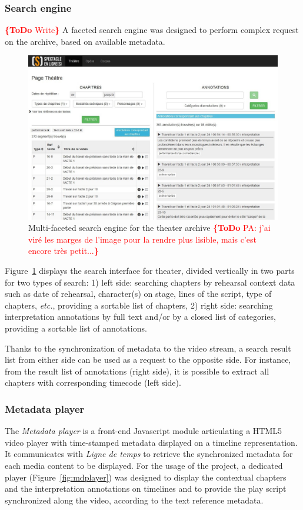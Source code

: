 \documentclass[conference]{IEEEtran}
\newcommand{\todo}[1]{\noindent\textcolor{red}{{\bf \{ToDo} #1{\bf \}}}}
\begin{document}
\subsubsection{Search engine}
\todo{Write}
A faceted search engine was designed to perform complex request on the archive, based on available metadata.

\begin{figure}[htb!]
  \centering
  \includegraphics[width=\columnwidth]{searchengine}
  \caption{Multi-faceted search engine for the theater archive
    \todo{PA: j'ai viré les marges de l'image pour la rendre plus lisible, mais c'est encore très petit...}}
  \label{fig:searchengine}
\end{figure}

Figure~\ref{fig:searchengine} displays the search interface for theater, divided vertically in two parts for two types of search:
1) left side: searching chapters by rehearsal context data such as date of rehearsal, character(s) on stage, lines of the script, type of chapters, \emph{etc.}, providing a sortable list of chapters,
2) right side: searching interpretation annotations by full text and/or by a closed list of categories, providing a sortable list of annotations.

Thanks to the synchronization of metadata to the video stream, a search result list from either side can be used as a request to the opposite side. For instance, from the result list of annotations (right side), it is possible to extract all chapters with corresponding timecode (left side).

\subsubsection{Metadata player}
The \emph{Metadata player} is a front-end Javascript module articulating a HTML5 video player with time-stamped metadata displayed on a timeline representation. It communicates with \emph{Ligne de temps} to retrieve the synchronized metadata for each media content to be displayed. For the usage of the project, a dedicated player (Figure~\ref{fig:mdplayer}) was designed to display the contextual chapters and the interpretation annotations on timelines and to provide the play script synchronized along the video, according to the text reference metadata.
\end{document}
